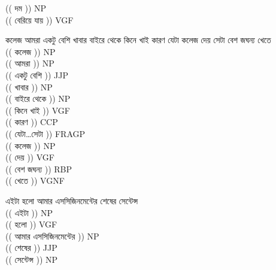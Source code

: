 \documentclass[11pt,a4paper]{article}
\begin{document}
\begin{enumerate}
{		\textcolor{diff}{(( দম ))} NP\\		
		\textcolor{diff}{(( বেরিয়ে যায় ))} VGF\\
$ $\\		
		\item কলেজ আমরা একটু বেশি খাবার বাইরে থেকে কিনে 
		খাই কারণ যেটা কলেজ দেয় সেটা বেশ জঘন্য খেতে  \\
		$ $\\
		\textcolor{diff}{(( কলেজ ))} NP\\		
		\textcolor{diff}{(( আমরা ))} NP\\		
		\textcolor{diff}{(( একটু বেশি ))} JJP\\		
		\textcolor{diff}{(( খাবার ))} NP\\		
		\textcolor{diff}{(( বাইরে থেকে ))} NP\\		
		\textcolor{diff}{(( কিনে খাই ))} VGF\\		
		\textcolor{diff}{(( কারণ ))} CCP\\		
		\textcolor{diff}{(( যেটা\ldots সেটা ))} FRAGP\\		
		\textcolor{diff}{(( কলেজ ))} NP\\		
		\textcolor{diff}{(( দেয় ))} VGF\\		
		\textcolor{diff}{(( বেশ জঘন্য ))} RBP\\		
		\textcolor{diff}{(( খেতে ))} VGNF\\		
$ $\\		
		\item এইটা হলো আমার এসসিজিনমেন্টের শেষের সেন্টেন্স  \\
		$ $\\
		\textcolor{diff}{(( এইটা ))} NP\\		
		\textcolor{diff}{(( হলো ))} VGF\\		
		\textcolor{diff}{(( আমার এসসিজিনমেন্টের ))} NP\\		
		\textcolor{diff}{(( শেষের ))} JJP\\		
		\textcolor{diff}{(( সেন্টেন্স ))} NP\\
				
	}	
	
	\end{enumerate}
\end{document}
